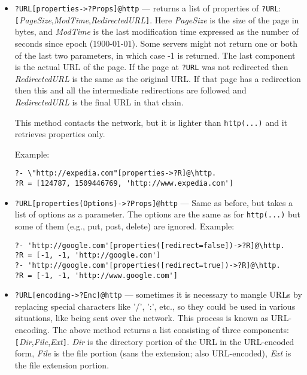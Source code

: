 \begin{itemize}
\item \texttt{?URL[properties->?Props]@\bs{}http} --- returns a list of
  properties of \texttt{?URL}:
  \texttt{[}\emph{PageSize},\emph{ModTime},\emph{RedirectedURL}\texttt{]}.
  Here
  \emph{PageSize} is the
  size of the page in bytes, and \emph{ModTime} is the last modification
  time expressed as the number of seconds since epoch (1900-01-01).   
  Some servers might not return one or both of the last two parameters, in
  which case -1 is returned.
  The last component is the actual URL of the page. If the page at
  \texttt{?URL} was not redirected then \emph{RedirectedURL} is the same as
  the original URL. If that page has a redirection then this and all the
  intermediate redirections are followed  and \emph{RedirectedURL} is the
  final URL in that chain.
  
  This method contacts the network, but it is lighter than
  \texttt{http(...)} and it retrieves properties only.

  Example:
\begin{verbatim}
?- \"http://expedia.com"[properties->?R]@\http.
?R = [124787, 1509446769, 'http://www.expedia.com']
\end{verbatim}
\item \texttt{?URL[properties(Options)->?Props]@\bs{}http} --- 
  Same as before, but takes a list of options as a parameter. The options
  are the same as for \texttt{http(...)} but some of them (e.g., put, post,
  delete) are ignored.  Example:
\begin{verbatim}
?- 'http://google.com'[properties([redirect=false])->?R]@\http.
?R = [-1, -1, 'http://google.com']
?- 'http://google.com'[properties([redirect=true])->?R]@\http.
?R = [-1, -1, 'http://www.google.com']
\end{verbatim}
\item \texttt{?URL[encoding->?Enc]@\bs{}http} --- sometimes it is necessary
  to mangle URLs by replacing special characters like '/', ':', etc., so
  they could be used in various situations, like being sent over the network.
  This process is known as URL-encoding. The above method
  returns a list consisting of three components:
  \texttt{[}\emph{Dir},\emph{File},\emph{Ext}\texttt{]}.
  \emph{Dir} is the directory portion of the URL in the URL-encoded
  form, \emph{File} is the file portion (sans the extension; also
  URL-encoded), \emph{Ext} is the file extension portion.
  

\end{itemize}
